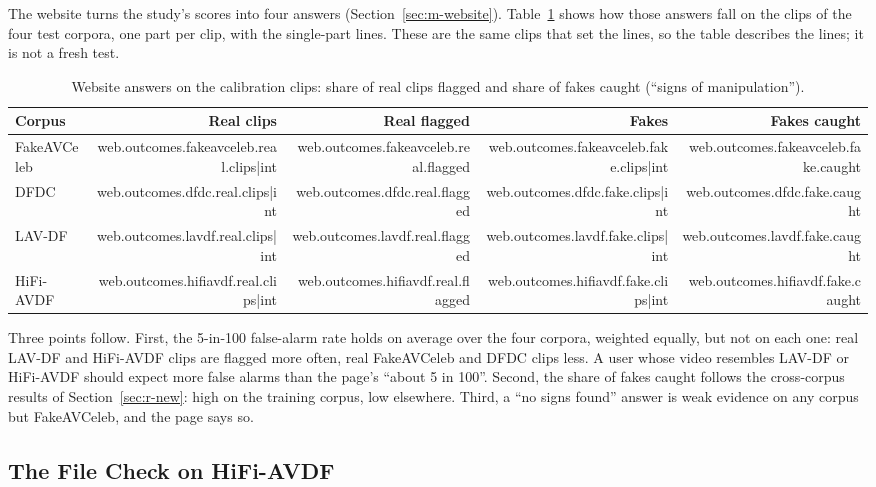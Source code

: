 The website turns the study's scores into four answers
(Section~\ref{sec:m-website}). Table~\ref{tab:web-outcomes} shows how those
answers fall on the clips of the four test corpora, one part per clip, with
the single-part lines. These are the same clips that set the lines, so the
table describes the lines; it is not a fresh test.

\begin{table}[ht]
    \centering
    \small
    \caption{Website answers on the calibration clips: share of real clips flagged and share of fakes caught (``signs of manipulation'').}
    \label{tab:web-outcomes}
    \begin{tabular}{@{}l r r r r@{}}
        \toprule
        \textbf{Corpus} & \textbf{Real clips} & \textbf{Real flagged} & \textbf{Fakes} & \textbf{Fakes caught} \\
        \midrule
        FakeAVCeleb & {{web.outcomes.fakeavceleb.real.clips|int}} & {{web.outcomes.fakeavceleb.real.flagged}} & {{web.outcomes.fakeavceleb.fake.clips|int}} & {{web.outcomes.fakeavceleb.fake.caught}} \\
        DFDC & {{web.outcomes.dfdc.real.clips|int}} & {{web.outcomes.dfdc.real.flagged}} & {{web.outcomes.dfdc.fake.clips|int}} & {{web.outcomes.dfdc.fake.caught}} \\
        LAV-DF & {{web.outcomes.lavdf.real.clips|int}} & {{web.outcomes.lavdf.real.flagged}} & {{web.outcomes.lavdf.fake.clips|int}} & {{web.outcomes.lavdf.fake.caught}} \\
        HiFi-AVDF & {{web.outcomes.hifiavdf.real.clips|int}} & {{web.outcomes.hifiavdf.real.flagged}} & {{web.outcomes.hifiavdf.fake.clips|int}} & {{web.outcomes.hifiavdf.fake.caught}} \\
        \bottomrule
    \end{tabular}
\end{table}

Three points follow. First, the 5-in-100 false-alarm rate holds on average
over the four corpora, weighted equally, but not on each one: real LAV-DF and
HiFi-AVDF clips are flagged more often, real FakeAVCeleb and DFDC clips less.
A user whose video resembles LAV-DF or HiFi-AVDF should expect more false
alarms than the page's ``about 5 in 100''. Second, the share of fakes caught
follows the cross-corpus results of Section~\ref{sec:r-new}: high on the
training corpus, low elsewhere. Third, a ``no signs found'' answer is weak
evidence on any corpus but FakeAVCeleb, and the page says so.

\subsection{The File Check on HiFi-AVDF}

